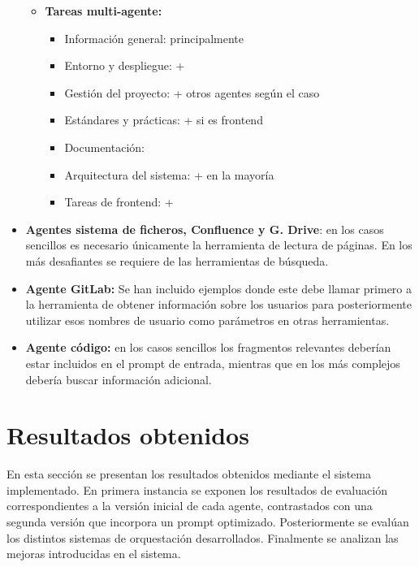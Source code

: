 \begin{itemize}
\begin{itemize}
\item \textbf{Tareas multi-agente:}
\begin{itemize}
\item Información general:  principalmente
\item Entorno y despliegue:  + 
\item Gestión del proyecto:  + otros agentes según el caso
\item Estándares y prácticas:  +  si es frontend
\item Documentación: 
\item Arquitectura del sistema:  +  en la mayoría
\item Tareas de frontend:  + 
\end{itemize}
\end{itemize}
\item\textbf{Agentes sistema de ficheros, Confluence y G. Drive}: en los casos sencillos es necesario únicamente la herramienta de lectura de páginas. En los más desafiantes se requiere de las herramientas de búsqueda.
\item\textbf{Agente GitLab: }Se han incluido ejemplos donde este debe llamar primero a la herramienta de obtener información sobre los usuarios para posteriormente utilizar esos nombres de usuario como parámetros en otras herramientas.
\item\textbf{Agente código: }en los casos sencillos los fragmentos relevantes deberían estar incluidos en el prompt de entrada, mientras que en los más complejos debería buscar información adicional.
\end{itemize}



\section{Resultados obtenidos}
En esta sección se presentan los resultados obtenidos mediante el sistema implementado. En primera instancia se exponen los resultados de evaluación correspondientes a la versión inicial de cada agente, contrastados con una segunda versión que incorpora un prompt optimizado. Posteriormente se evalúan los distintos sistemas de orquestación desarrollados. Finalmente se analizan las mejoras introducidas en el sistema.

